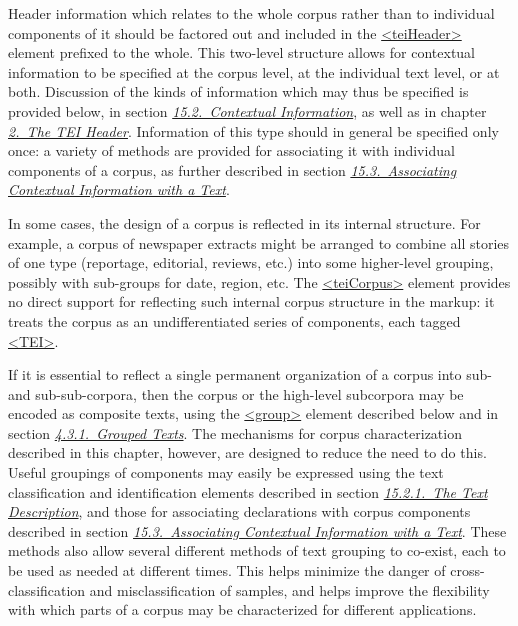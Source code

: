 Header information which relates to the whole corpus rather than to individual components of it should be factored out and included in the \hyperref[TEI.teiHeader]{<teiHeader>} element prefixed to the whole. This two-level structure allows for contextual information to be specified at the corpus level, at the individual text level, or at both. Discussion of the kinds of information which may thus be specified is provided below, in section \textit{\hyperref[CCAH]{15.2.\ Contextual Information}}, as well as in chapter \textit{\hyperref[HD]{2.\ The TEI Header}}. Information of this type should in general be specified only once: a variety of methods are provided for associating it with individual components of a corpus, as further described in section \textit{\hyperref[CCAS]{15.3.\ Associating Contextual Information with a Text}}.\par
In some cases, the design of a corpus is reflected in its internal structure. For example, a corpus of newspaper extracts might be arranged to combine all stories of one type (reportage, editorial, reviews, etc.) into some higher-level grouping, possibly with sub-groups for date, region, etc. The \hyperref[TEI.teiCorpus]{<teiCorpus>} element provides no direct support for reflecting such internal corpus structure in the markup: it treats the corpus as an undifferentiated series of components, each tagged \hyperref[TEI.TEI]{<TEI>}.\par
If it is essential to reflect a single permanent organization of a corpus into sub- and sub-sub-corpora, then the corpus or the high-level subcorpora may be encoded as composite texts, using the \hyperref[TEI.group]{<group>} element described below and in section \textit{\hyperref[DSGRP]{4.3.1.\ Grouped Texts}}. The mechanisms for corpus characterization described in this chapter, however, are designed to reduce the need to do this. Useful groupings of components may easily be expressed using the text classification and identification elements described in section \textit{\hyperref[CCAHTD]{15.2.1.\ The Text Description}}, and those for associating declarations with corpus components described in section \textit{\hyperref[CCAS]{15.3.\ Associating Contextual Information with a Text}}. These methods also allow several different methods of text grouping to co-exist, each to be used as needed at different times. This helps minimize the danger of cross-classification and misclassification of samples, and helps improve the flexibility with which parts of a corpus may be characterized for different applications.\par

